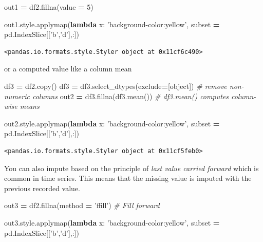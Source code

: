 \documentclass[
  letterpaper,
]{scrbook}
\newenvironment{Shaded}{\begin{snugshade}}{\end{snugshade}}
\newcommand{\BuiltInTok}[1]{#1}
\newcommand{\CommentTok}[1]{\textcolor[rgb]{0.56,0.35,0.01}{\textit{#1}}}
\newcommand{\DecValTok}[1]{\textcolor[rgb]{0.00,0.00,0.81}{#1}}
\newcommand{\KeywordTok}[1]{\textcolor[rgb]{0.13,0.29,0.53}{\textbf{#1}}}
\newcommand{\NormalTok}[1]{#1}
\newcommand{\OperatorTok}[1]{\textcolor[rgb]{0.81,0.36,0.00}{\textbf{#1}}}
\newcommand{\StringTok}[1]{\textcolor[rgb]{0.31,0.60,0.02}{#1}}
\begin{document}
\begin{Shaded}
\begin{Highlighting}[]
\NormalTok{out1 }\OperatorTok{=}\NormalTok{ df2.fillna(value }\OperatorTok{=} \DecValTok{5}\NormalTok{)}

\NormalTok{out1.style.applymap(}\KeywordTok{lambda}\NormalTok{ x: }\StringTok{'background-color:yellow'}\NormalTok{, subset }\OperatorTok{=}\NormalTok{ pd.IndexSlice[[}\StringTok{'b'}\NormalTok{,}\StringTok{'d'}\NormalTok{],:])}
\end{Highlighting}
\end{Shaded}

\begin{verbatim}
<pandas.io.formats.style.Styler object at 0x11cf6c490>
\end{verbatim}

or a computed value like a column mean

\begin{Shaded}
\begin{Highlighting}[]
\NormalTok{df3 }\OperatorTok{=}\NormalTok{ df2.copy()}
\NormalTok{df3 }\OperatorTok{=}\NormalTok{ df3.select_dtypes(exclude}\OperatorTok{=}\NormalTok{[}\BuiltInTok{object}\NormalTok{])   }\CommentTok{# remove non-numeric columns}
\NormalTok{out2 }\OperatorTok{=}\NormalTok{ df3.fillna(df3.mean())  }\CommentTok{# df3.mean() computes column-wise means}

\NormalTok{out2.style.applymap(}\KeywordTok{lambda}\NormalTok{ x: }\StringTok{'background-color:yellow'}\NormalTok{, subset }\OperatorTok{=}\NormalTok{ pd.IndexSlice[[}\StringTok{'b'}\NormalTok{,}\StringTok{'d'}\NormalTok{],:])}
\end{Highlighting}
\end{Shaded}

\begin{verbatim}
<pandas.io.formats.style.Styler object at 0x11cf5feb0>
\end{verbatim}

You can also impute based on the principle of \emph{last value carried forward} which is common in time series. This means that the missing value is imputed with the previous recorded value.

\begin{Shaded}
\begin{Highlighting}[]
\NormalTok{out3 }\OperatorTok{=}\NormalTok{ df2.fillna(method }\OperatorTok{=} \StringTok{'ffill'}\NormalTok{) }\CommentTok{# Fill forward}

\NormalTok{out3.style.applymap(}\KeywordTok{lambda}\NormalTok{ x: }\StringTok{'background-color:yellow'}\NormalTok{, subset }\OperatorTok{=}\NormalTok{ pd.IndexSlice[[}\StringTok{'b'}\NormalTok{,}\StringTok{'d'}\NormalTok{],:])}
\end{Highlighting}
\end{Shaded}
\end{document}
